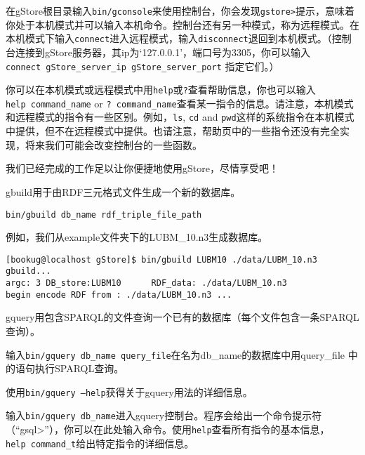 \documentclass[titlepage, a4paper, 12pt]{article}
\begin{document}
在gStore根目录输入\texttt{bin/gconsole}来使用控制台，你会发现\texttt{gstore\textgreater{}}提示，意味着你处于本机模式并可以输入本机命令。控制台还有另一种模式，称为远程模式。在本机模式下输入\texttt{connect}进入远程模式，输入\texttt{disconnect}退回到本机模式。（控制台连接到gStore服务器，其ip为`127.0.0.1'，端口号为3305，你可以输入\texttt{connect\ gStore\_server\_ip\ gStore\_server\_port} 指定它们。）

你可以在本机模式或远程模式中用\texttt{help}或\texttt{?}查看帮助信息，你也可以输入\texttt{help\ command\_name} or \texttt{?\ command\_name}查看某一指令的信息。请注意，本机模式和远程模式的指令有一些区别。例如，\texttt{ls}, \texttt{cd} and \texttt{pwd}这样的系统指令在本机模式中提供，但不在远程模式中提供。也请注意，帮助页中的一些指令还没有完全实现，将来我们可能会改变控制台的一些函数。

我们已经完成的工作足以让你便捷地使用gStore，尽情享受吧！


gbuild用于由RDF三元格式文件生成一个新的数据库。

\texttt{bin/gbuild\ db\_name\ rdf\_triple\_file\_path}

例如，我们从example文件夹下的LUBM\_10.n3生成数据库。

\begin{verbatim}
[bookug@localhost gStore]$ bin/gbuild LUBM10 ./data/LUBM_10.n3
gbuild...
argc: 3 DB_store:LUBM10      RDF_data: ./data/LUBM_10.n3
begin encode RDF from : ./data/LUBM_10.n3 ...
\end{verbatim}


gquery用包含SPARQL的文件查询一个已有的数据库（每个文件包含一条SPARQL查询）。

输入\texttt{bin/gquery\ db\_name\ query\_file}在名为db\_name的数据库中用query\_file 中的语句执行SPARQL查询。

使用\texttt{bin/gquery\ --help}获得关于gquery用法的详细信息。

输入\texttt{bin/gquery\ db\_name}进入gquery控制台。程序会给出一个命令提示符（“gsql\textgreater{}”），你可以在此处输入命令。使用\texttt{help}查看所有指令的基本信息，\texttt{help\ command\_t}给出特定指令的详细信息。
\end{document}
